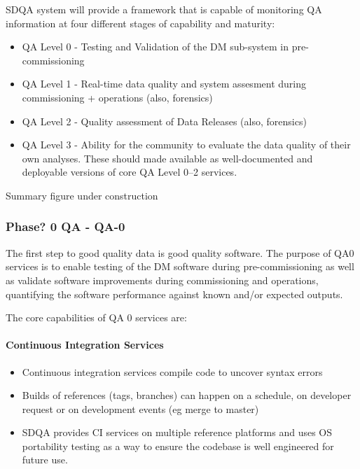 SDQA system will provide a framework that is capable of monitoring QA
information at four different stages of capability and maturity:

\begin{itemize}
\item QA Level 0 - Testing and Validation of the DM sub-system in pre-commissioning 
\item QA Level 1 - Real-time data quality and system assesment during commissioning + operations (also, forensics)
\item QA Level 2 - Quality assessment of Data Releases (also, forensics) 
\item QA Level 3 - Ability for the community to evaluate the data quality of their own analyses. These should made available as well-documented and deployable versions of core QA Level 0--2 services. 
\end{itemize}

\begin{note}
Summary figure under construction
\end{note}

\subsubsection{Phase? 0 QA - QA-0}

The first step to good quality data is good quality software. The
purpose of QA0 services is to enable testing of the DM software during
pre-commissioning as well as validate software improvements during
commissioning and operations, quantifying the software performance
against known and/or expected outputs.

The core capabilities of QA 0 services are:

\paragraph{Continuous Integration Services}
\label{sec:qaCI}
\begin{itemize}

\item Continuous integration services compile code to uncover syntax errors

\item Builds of references (tags, branches) can happen on a schedule, on developer request or on development events (eg merge to master)

\item SDQA provides CI services on multiple reference platforms and uses OS portability testing as a way to ensure the codebase is well engineered for future use. 

\end{itemize}

